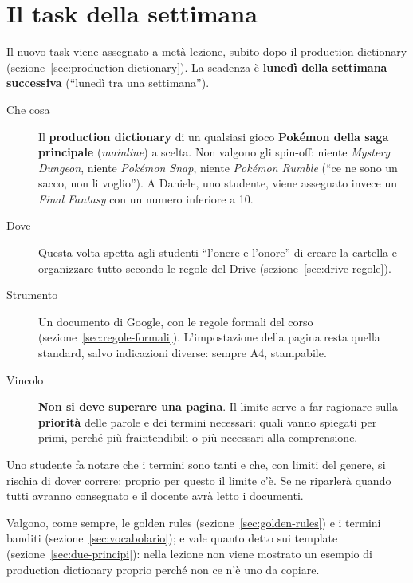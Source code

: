 \section{Il task della settimana}
\label{sec:task-gd4}

Il nuovo task viene assegnato a metà lezione, subito dopo il production
dictionary (sezione~\ref{sec:production-dictionary}). La scadenza è
\textbf{lunedì della settimana successiva} (``lunedì tra una settimana'').

\begin{description}
  \item[Che cosa] Il \textbf{production dictionary} di un qualsiasi gioco
        \textbf{Pokémon della saga principale} (\emph{mainline}) a scelta. Non
        valgono gli spin-off: niente \emph{Mystery Dungeon}, niente
        \emph{Pokémon Snap}, niente \emph{Pokémon Rumble} (``ce ne sono un
        sacco, non li voglio''). A Daniele, uno studente, viene assegnato
        invece un \emph{Final Fantasy} con un numero inferiore a 10.
  \item[Dove] Questa volta spetta agli studenti ``l'onere e l'onore'' di
        creare la cartella e organizzare tutto secondo le regole del Drive
        (sezione~\ref{sec:drive-regole}).
  \item[Strumento] Un documento di Google, con le regole formali del corso
        (sezione~\ref{sec:regole-formali}). L'impostazione della pagina resta
        quella standard, salvo indicazioni diverse: sempre A4, stampabile.
  \item[Vincolo] \textbf{Non si deve superare una pagina}. Il limite serve a
        far ragionare sulla \textbf{priorità} delle parole e dei termini
        necessari: quali vanno spiegati per primi, perché più fraintendibili o
        più necessari alla comprensione.
\end{description}

Uno studente fa notare che i termini sono tanti e che, con limiti del genere,
si rischia di dover correre: proprio per questo il limite c'è. Se ne
riparlerà quando tutti avranno consegnato e il docente avrà letto i
documenti.

Valgono, come sempre, le golden rules (sezione~\ref{sec:golden-rules}) e i
termini banditi (sezione~\ref{sec:vocabolario}); e vale quanto detto sui
template (sezione~\ref{sec:due-principi}): nella lezione non viene mostrato un
esempio di production dictionary proprio perché non ce n'è uno da copiare.

